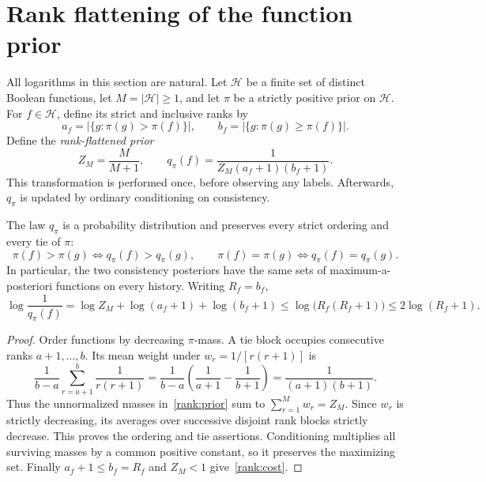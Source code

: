 \section{Rank flattening of the function prior}
\label{rank:section}

All logarithms in this section are natural. Let $\mathcal H$ be a finite
set of distinct Boolean functions, let $M=|\mathcal H|\ge1$, and let
$\pi$ be a strictly positive prior on $\mathcal H$. For $f\in\mathcal H$,
define its strict and inclusive ranks by
\[
 a_f=|\{g:\pi(g)>\pi(f)\}|,\qquad
 b_f=|\{g:\pi(g)\ge\pi(f)\}|.
\]
Define the \emph{rank-flattened prior}
\begin{equation}\label{rank:prior}
 Z_M=\frac{M}{M+1},\qquad
 q_\pi(f)=\frac{1}{Z_M(a_f+1)(b_f+1)}.
\end{equation}
This transformation is performed once, before observing any labels.
Afterwards, $q_\pi$ is updated by ordinary conditioning on consistency.

\begin{proposition}
\label{rank:normalization}
The law $q_\pi$ is a probability distribution and preserves every strict
ordering and every tie of $\pi$:
\[
 \pi(f)>\pi(g)\iff q_\pi(f)>q_\pi(g),\qquad
 \pi(f)=\pi(g)\iff q_\pi(f)=q_\pi(g).
\]
In particular, the two consistency posteriors have the same sets of
maximum-a-posteriori functions on every history. Writing $R_f=b_f$,
\begin{equation}\label{rank:cost}
 \log\frac1{q_\pi(f)}
 =\log Z_M+\log(a_f+1)+\log(b_f+1)
 \le\log\bigl(R_f(R_f+1)\bigr)
 \le2\log(R_f+1).
\end{equation}
\end{proposition}

\begin{proof}
Order functions by decreasing $\pi$-mass. A tie block occupies consecutive
ranks $a+1,\ldots,b$. Its mean weight under $w_r=1/[r(r+1)]$ is
\[
 \frac1{b-a}\sum_{r=a+1}^b\frac1{r(r+1)}
 =\frac1{b-a}\left(\frac1{a+1}-\frac1{b+1}\right)
 =\frac1{(a+1)(b+1)}.
\]
Thus the unnormalized masses in~\eqref{rank:prior} sum to
$\sum_{r=1}^M w_r=Z_M$. Since $w_r$ is strictly decreasing, its averages
over successive disjoint rank blocks strictly decrease. This proves the
ordering and tie assertions. Conditioning multiplies all surviving
masses by a common positive constant, so it preserves the maximizing
set. Finally $a_f+1\le b_f=R_f$ and $Z_M<1$ give~\eqref{rank:cost}.
\end{proof}

